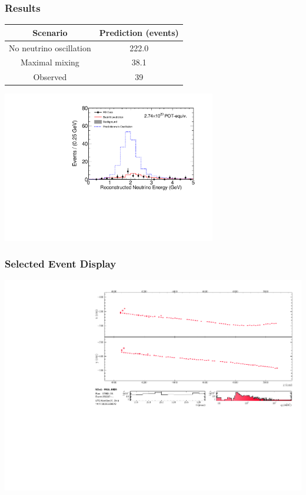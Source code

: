 \documentclass[10pt,professionalfonts,xcolor=table]{beamer}
\begin{document}
\begin{frame}
\frametitle{Results}
\centering
\begin{tabular}{c c }
Scenario & Prediction (events) \\ \hline
No neutrino oscillation & 222.0 \\
Maximal mixing & 38.1 \\ \hline
Observed & 39

\end{tabular}

\includegraphics[angle=-90,width=0.7\textwidth]{figures/results/fd_data_mc_numi_plots/ccE_unblind_wUnosc.pdf}

\end{frame}


\begin{frame}
\frametitle{Selected Event Display}
\includegraphics[angle=-90, width=1\textwidth]{figures/results/evd/evd_xzyx-proj_17953_256887.pdf}
\end{frame}
\end{document}
